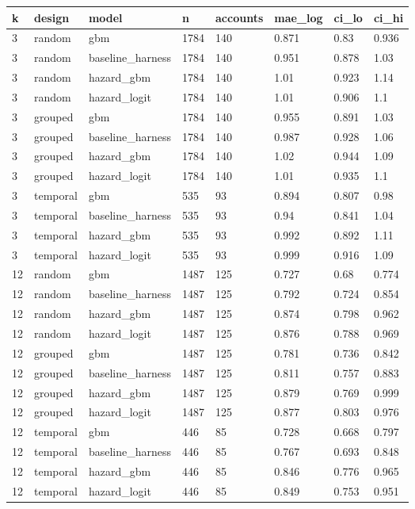 \begin{tabular}{llllllll}
\toprule
k & design & model & n & accounts & mae\_log & ci\_lo & ci\_hi \\
\midrule
3 & random & gbm & 1784 & 140 & 0.871 & 0.83 & 0.936 \\
3 & random & baseline\_harness & 1784 & 140 & 0.951 & 0.878 & 1.03 \\
3 & random & hazard\_gbm & 1784 & 140 & 1.01 & 0.923 & 1.14 \\
3 & random & hazard\_logit & 1784 & 140 & 1.01 & 0.906 & 1.1 \\
3 & grouped & gbm & 1784 & 140 & 0.955 & 0.891 & 1.03 \\
3 & grouped & baseline\_harness & 1784 & 140 & 0.987 & 0.928 & 1.06 \\
3 & grouped & hazard\_gbm & 1784 & 140 & 1.02 & 0.944 & 1.09 \\
3 & grouped & hazard\_logit & 1784 & 140 & 1.01 & 0.935 & 1.1 \\
3 & temporal & gbm & 535 & 93 & 0.894 & 0.807 & 0.98 \\
3 & temporal & baseline\_harness & 535 & 93 & 0.94 & 0.841 & 1.04 \\
3 & temporal & hazard\_gbm & 535 & 93 & 0.992 & 0.892 & 1.11 \\
3 & temporal & hazard\_logit & 535 & 93 & 0.999 & 0.916 & 1.09 \\
12 & random & gbm & 1487 & 125 & 0.727 & 0.68 & 0.774 \\
12 & random & baseline\_harness & 1487 & 125 & 0.792 & 0.724 & 0.854 \\
12 & random & hazard\_gbm & 1487 & 125 & 0.874 & 0.798 & 0.962 \\
12 & random & hazard\_logit & 1487 & 125 & 0.876 & 0.788 & 0.969 \\
12 & grouped & gbm & 1487 & 125 & 0.781 & 0.736 & 0.842 \\
12 & grouped & baseline\_harness & 1487 & 125 & 0.811 & 0.757 & 0.883 \\
12 & grouped & hazard\_gbm & 1487 & 125 & 0.879 & 0.769 & 0.999 \\
12 & grouped & hazard\_logit & 1487 & 125 & 0.877 & 0.803 & 0.976 \\
12 & temporal & gbm & 446 & 85 & 0.728 & 0.668 & 0.797 \\
12 & temporal & baseline\_harness & 446 & 85 & 0.767 & 0.693 & 0.848 \\
12 & temporal & hazard\_gbm & 446 & 85 & 0.846 & 0.776 & 0.965 \\
12 & temporal & hazard\_logit & 446 & 85 & 0.849 & 0.753 & 0.951 \\
\bottomrule
\end{tabular}